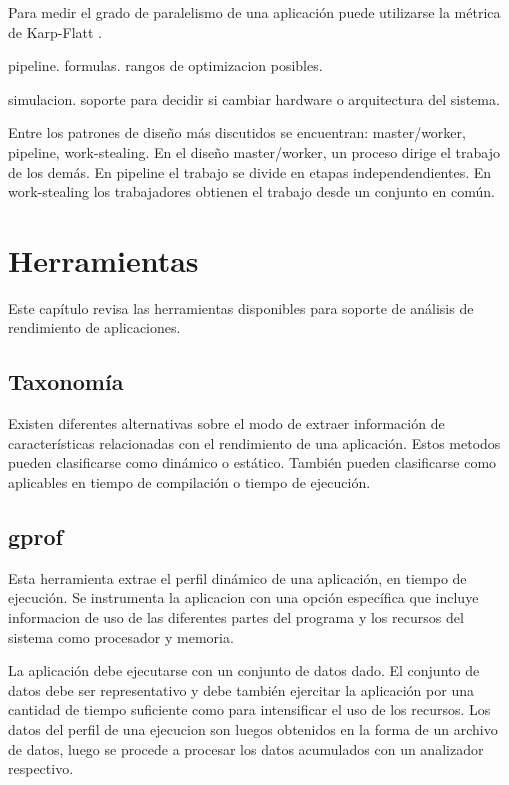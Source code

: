 \documentclass[a4paper]{report}
\begin{document}
\bigskip

Para medir el grado de paralelismo de una aplicaci\'on puede utilizarse la
m\'etrica de Karp-Flatt \cite{karp-flatt}.

pipeline. formulas. rangos de optimizacion posibles.

simulacion. soporte para decidir si cambiar hardware o arquitectura del
sistema.

\bigskip

Entre los patrones de dise\~no m\'as discutidos se encuentran: master/worker,
pipeline, work-stealing. En el dise\~no master/worker, un proceso dirige el
trabajo de los dem\'as. En pipeline el trabajo se divide en etapas
independendientes. En work-stealing los trabajadores obtienen el trabajo desde
un conjunto en com\'un.

\chapter{Herramientas}

Este cap\'itulo revisa las herramientas disponibles para soporte de an\'alisis
de rendimiento de aplicaciones.

\section{Taxonom\'ia}

Existen diferentes alternativas sobre el modo de extraer informaci\'on de
caracter\'isticas relacionadas con el rendimiento de una aplicaci\'on.
Estos metodos pueden clasificarse como din\'amico o est\'atico.
Tambi\'en pueden clasificarse como aplicables en tiempo de compilaci\'on o
tiempo de ejecuci\'on.

\section{gprof}

Esta herramienta extrae el perfil din\'amico de una aplicaci\'on, en tiempo
de ejecuci\'on. Se instrumenta la aplicacion con una opci\'on espec\'ifica que
incluye informacion de uso de las diferentes partes del programa y los
recursos del sistema como procesador y memoria.

\bigskip

La aplicaci\'on debe ejecutarse con un conjunto de datos dado. El conjunto de
datos debe ser representativo y debe tambi\'en ejercitar la aplicaci\'on por
una cantidad de tiempo suficiente como para intensificar el uso de los
recursos. Los datos del perfil de una ejecucion son luegos obtenidos en la
forma de un archivo de datos, luego se procede a procesar los datos acumulados
con un analizador respectivo.
\end{document}

